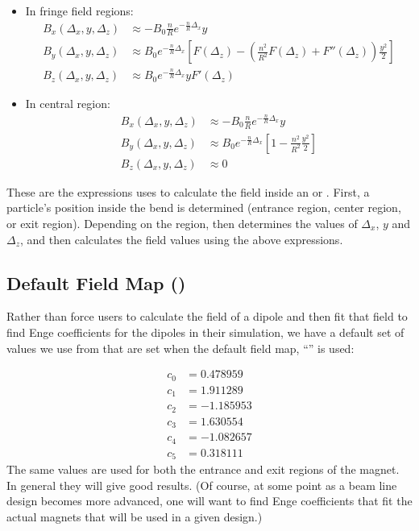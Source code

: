 \begin{itemize}
\item In fringe field regions:
\begin{align*}
B_x(\Delta_x, y, \Delta_z) &\approx -B_0 \frac{n}{R} e^{-\frac{n}{R} \Delta_x} y \\
B_y(\Delta_x, y, \Delta_z) &\approx B_0 e^{-\frac{n}{R} \Delta_x} \left[ F(\Delta_z) - \left( \frac{n^2}{R^2} F(\Delta_z) + F''(\Delta_z) \right) \frac{y^2}{2} \right] \\
B_z(\Delta_x, y, \Delta_z) &\approx B_0 e^{-\frac{n}{R} \Delta_x} y F'(\Delta_z)
\end{align*}
\item In central region:
\begin{align*}
B_x(\Delta_x, y, \Delta_z) &\approx -B_0 \frac{n}{R} e^{-\frac{n}{R} \Delta_x} y \\
B_y(\Delta_x, y, \Delta_z) &\approx B_0 e^{-\frac{n}{R} \Delta_x} \left[ 1 -  \frac{n^2}{R^2} \frac{y^2}{2} \right] \\
B_z(\Delta_x, y, \Delta_z) &\approx 0
\end{align*}
\end{itemize}
These are the expressions \opalt uses to calculate the field inside an  or . First, a particle's position inside the bend is determined (entrance region, center region, or exit region). Depending on the region, \opalt then determines the values of $\Delta_x$, $y$ and $\Delta_z$, and then calculates the field values using the above expressions.

\subsection{Default Field Map (\opalt)}
\label{ssec:benddefaultfieldmapopalt}
Rather than force users to calculate the field of a dipole and then fit that field to find Enge coefficients
for the dipoles in their simulation, we have a default set of values we use from \cite{enge} that are set
when the default field map, ``'' is used:

\begin{align*}
  c_{0} &= 0.478959 \\
  c_{1} &= 1.911289 \\
  c_{2} &= -1.185953 \\
  c_{3} &= 1.630554 \\
  c_{4} &= -1.082657 \\
  c_{5} &= 0.318111
\end{align*}
The same values are used for both the entrance and exit regions of the magnet. In general they will
give good results. (Of course, at some point as a beam line design becomes more advanced, one will want to find
Enge coefficients that fit the actual magnets that will be used in a given design.)

